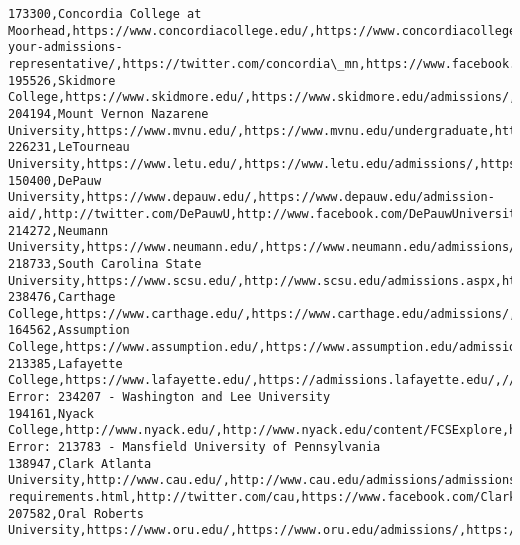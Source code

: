 \documentclass[11pt]{article}
\begin{document}
\begin{Verbatim}[commandchars=\\\{\}]
173300,Concordia College at Moorhead,https://www.concordiacollege.edu/,https://www.concordiacollege.edu/admission/meet-your-admissions-representative/,https://twitter.com/concordia\_mn,https://www.facebook.com/concordiacollege,http://instagram.com/concordia\_mn\#
195526,Skidmore College,https://www.skidmore.edu/,https://www.skidmore.edu/admissions/,https://twitter.com/SkidmoreCollege,https://www.facebook.com/SkidmoreCollege,http://instagram.com/skidmorecollege
204194,Mount Vernon Nazarene University,https://www.mvnu.edu/,https://www.mvnu.edu/undergraduate,https://twitter.com/MVNUNews,https://www.facebook.com/thisismvnu/,https://www.instagram.com/mvnu1968/
226231,LeTourneau University,https://www.letu.edu/,https://www.letu.edu/admissions/,https://twitter.com/letourneauuniv,https://www.facebook.com/myletu/,https://www.instagram.com/letourneauuniversity
150400,DePauw University,https://www.depauw.edu/,https://www.depauw.edu/admission-aid/,http://twitter.com/DePauwU,http://www.facebook.com/DePauwUniversity,https://www.instagram.com/depauwu/ 
214272,Neumann University,https://www.neumann.edu/,https://www.neumann.edu/admissions/default.asp,https://twitter.com/NeumannUniv,https://www.facebook.com/neumannuniversity,https://www.instagram.com/neumannuniv/
218733,South Carolina State University,https://www.scsu.edu/,http://www.scsu.edu/admissions.aspx,http://twitter.com/share,https://www.facebook.com/SCState1896,http://instagram.com/scstate1896\#
238476,Carthage College,https://www.carthage.edu/,https://www.carthage.edu/admissions/,https://www.carthage.edu/twitter/,https://www.carthage.edu/facebook/,https://www.carthage.edu/instagram/
164562,Assumption College,https://www.assumption.edu/,https://www.assumption.edu/admissions,https://twitter.com/AssumptionNews,https://www.facebook.com/assumptioncollege,http://instagram.com/achoundbound/
213385,Lafayette College,https://www.lafayette.edu/,https://admissions.lafayette.edu/,//twitter.com/LafCol,//www.facebook.com/LafayetteCollege.edu,//instagram.com/lafayettecollege/
Error: 234207 - Washington and Lee University
194161,Nyack College,http://www.nyack.edu/,http://www.nyack.edu/content/FCSExplore,http://twitter.com/NyackCollege,http://facebook.com/NyackCollege,http://instagram.com/NyackCollege
Error: 213783 - Mansfield University of Pennsylvania
138947,Clark Atlanta University,http://www.cau.edu/,http://www.cau.edu/admissions/admissions-requirements.html,http://twitter.com/cau,https://www.facebook.com/ClarkAtlantaUniversity,http://instagram.com/cau1988
207582,Oral Roberts University,https://www.oru.edu/,https://www.oru.edu/admissions/,https://twitter.com/OralRobertsU,https://www.facebook.com/OralRobertsUniversity/,https://instagram.com/OralRobertsU

\end{Verbatim}
\end{document}
